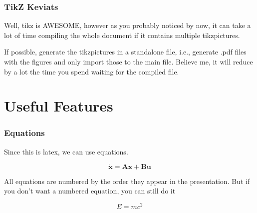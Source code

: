 \documentclass[8pt, hyperref={bookmarks=false},aspectratio=169, xcolor=table]{beamer}
\begin{document}

\begin{frame}\frametitle{TikZ Keviats}
  Well, tikz is AWESOME, however as you probably noticed by now, it can take a lot of time compiling the whole document if it contains multiple tikzpictures.
  
  If possible, generate the tikzpictures in a standalone file, i.e., generate .pdf files with the figures and only import those to the main file. Believe me, it will reduce by a lot the time you spend waiting for the compiled file.
\end{frame}

\section{Useful Features}

\begin{frame}\frametitle{Equations}
  Since this is latex, we can use equations.

  \vspace{0.2cm}

  \begin{equation}
    \dot{\mathbf{x}} = \mathbf{A}\mathbf{x} + \mathbf{B}\mathbf{u}
  \end{equation}

  \vspace{0.2cm}

  All equations are numbered by the order they appear in the presentation. But if you don't want a numbered equation, you can still do it

  \vspace{0.2cm}
  
  \begin{equation*}
    E = mc^2
  \end{equation*}
\end{frame}


 
\end{document}
